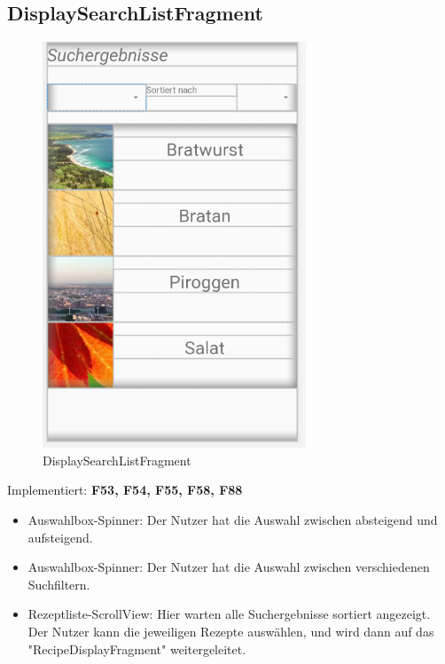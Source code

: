 \subsection{DisplaySearchListFragment}
\begin{figure}[H]
	\centering
	\includegraphics[width=0.7\textwidth]{pics/displaysearchlistFragment.png}%
	\caption{DisplaySearchListFragment}%
	\label{view}%
\end{figure}
Implementiert: \textbf{F53, F54, F55, F58, F88}
\begin{itemize}[nosep]
	\item 	Auswahlbox-Spinner: Der Nutzer hat die Auswahl zwischen absteigend und aufsteigend.
	\item 	Auswahlbox-Spinner: Der Nutzer hat die Auswahl zwischen verschiedenen Suchfiltern.
	\item 	Rezeptliste-ScrollView: Hier warten alle Suchergebnisse sortiert angezeigt. Der Nutzer kann die jeweiligen Rezepte auswählen, und wird dann auf das "RecipeDisplayFragment" weitergeleitet.
\end{itemize}

